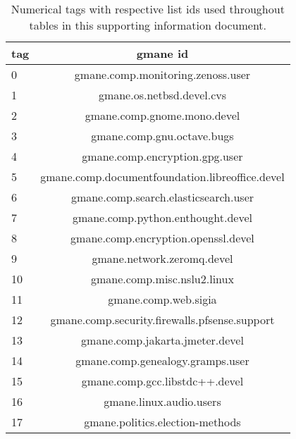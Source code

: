 \begin{table}[h!]
\begin{center}
\begin{tabular}{| l | c |}\hline
tag & gmane id \\\hline
0 & gmane.comp.monitoring.zenoss.user \\\hline
1 & gmane.os.netbsd.devel.cvs \\\hline
2 & gmane.comp.gnome.mono.devel \\\hline
3 & gmane.comp.gnu.octave.bugs \\\hline
4 & gmane.comp.encryption.gpg.user \\\hline
5 & gmane.comp.documentfoundation.libreoffice.devel \\\hline
6 & gmane.comp.search.elasticsearch.user \\\hline
7 & gmane.comp.python.enthought.devel \\\hline
8 & gmane.comp.encryption.openssl.devel \\\hline
9 & gmane.network.zeromq.devel \\\hline
10 & gmane.comp.misc.nslu2.linux \\\hline
11 & gmane.comp.web.sigia \\\hline
12 & gmane.comp.security.firewalls.pfsense.support \\\hline
13 & gmane.comp.jakarta.jmeter.devel \\\hline
14 & gmane.comp.genealogy.gramps.user \\\hline
15 & gmane.comp.gcc.libstdc++.devel \\\hline
16 & gmane.linux.audio.users \\\hline
17 & gmane.politics.election-methods \\\hline
\end{tabular}
\caption{Numerical tags with respective list ids used throughout tables in this supporting information document.}
\end{center}
\end{table}
